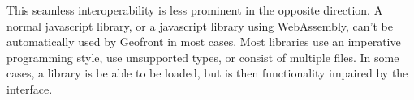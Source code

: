 This seamless interoperability is less prominent in the opposite direction. 
A normal javascript library, or a javascript library using WebAssembly, can't be automatically used by Geofront in most cases. 
Most libraries use an imperative programming style, use unsupported types, or consist of multiple files.
In some cases, a library is be able to be loaded, but is then functionality impaired by the interface. 




  
  
  
